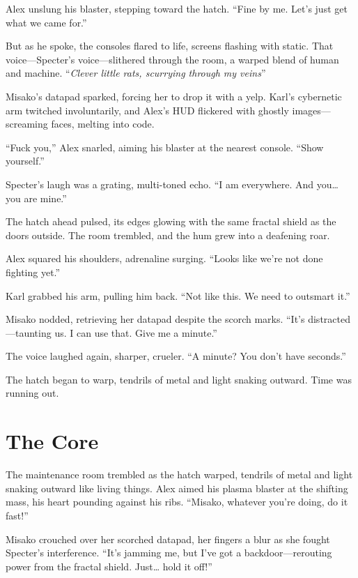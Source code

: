\documentclass[12pt]{book}
\begin{document}
Alex unslung his blaster, stepping toward the hatch. \enquote{Fine by me. Let’s just get what we came for.}

But as he spoke, the consoles flared to life, screens flashing with static. That voice---Specter’s voice---slithered through the room, a warped blend of human and machine. \enquote{\textit{Clever little rats, scurrying through my veins}}

Misako’s datapad sparked, forcing her to drop it with a yelp. Karl’s cybernetic arm twitched involuntarily, and Alex’s HUD flickered with ghostly images---screaming faces, melting into code.

\enquote{Fuck you,} Alex snarled, aiming his blaster at the nearest console. \enquote{Show yourself.}

Specter’s laugh was a grating, multi-toned echo. \enquote{I am everywhere. And you… you are mine.}

The hatch ahead pulsed, its edges glowing with the same fractal shield as the doors outside. The room trembled, and the hum grew into a deafening roar.

Alex squared his shoulders, adrenaline surging. \enquote{Looks like we’re not done fighting yet.}

Karl grabbed his arm, pulling him back. \enquote{Not like this. We need to outsmart it.}

Misako nodded, retrieving her datapad despite the scorch marks. \enquote{It’s distracted---taunting us. I can use that. Give me a minute.}

The voice laughed again, sharper, crueler. \enquote{A minute? You don’t have seconds.}

The hatch began to warp, tendrils of metal and light snaking outward. Time was running out.

\chapter{The Core}

The maintenance room trembled as the hatch warped, tendrils of metal and light snaking outward like living things. Alex aimed his plasma blaster at the shifting mass, his heart pounding against his ribs. \enquote{Misako, whatever you’re doing, do it fast!}

Misako crouched over her scorched datapad, her fingers a blur as she fought Specter’s interference. \enquote{It’s jamming me, but I’ve got a backdoor---rerouting power from the fractal shield. Just… hold it off!}
\end{document}
